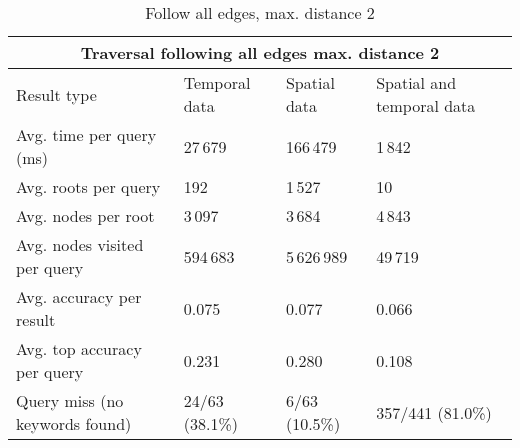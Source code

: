 \begin{table}[h]
	\caption{Follow all edges, max. distance 2}
	\label{table:followAll2}
	\begin{tabular}{ |p{3cm}||p{3cm}|p{3cm}|p{3cm}|  }
		\hline
		\multicolumn{4}{|c|}{Traversal following all edges max. distance 2}                         \\
		\hline
		Result type                    & Temporal data  & Spatial data  & Spatial and temporal data \\
		\hline
		Avg. time per query (ms)       & 27\,679        & 166\,479      & 1\,842                    \\
		Avg. roots per query           & 192            & 1\,527        & 10                        \\
		Avg. nodes per root            & 3\,097         & 3\,684        & 4\,843                    \\
		Avg. nodes visited per query   & 594\,683       & 5\,626\,989   & 49\,719                   \\
		Avg. accuracy per result       & 0.075          & 0.077         & 0.066                     \\
		Avg. top accuracy per query    & 0.231          & 0.280         & 0.108                     \\
		Query miss (no keywords found) & 24/63 (38.1\%) & 6/63 (10.5\%) & 357/441 (81.0\%)          \\
		\hline
	\end{tabular}
\end{table}
